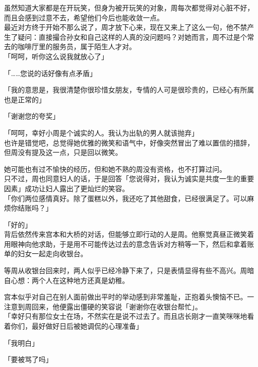 虽然知道大家都是在开玩笑，但身为被开玩笑的对象，周每次都觉得对心脏不好，而且会感到过意不去，希望他们今后也能收敛一点。\\

最近对方终于开始不那么说了，周才放下心来，现在又来上了这么一句，他不禁产生了疑问：直接撮合孙女和自己这样的人真的没问题吗？对她而言，周不过是个常去的咖啡厅里的服务员，属于陌生人才对。\\

「呵呵，听你这么说我就放心了」

「……您说的话好像有点矛盾」

「我的意思是，我很清楚你很珍惜女朋友，专情的人可是很珍贵的，已经心有所属也是正常的」

「谢谢您的夸奖」

「呵呵，幸好小周是个诚实的人。我认为出轨的男人就该抛弃」\\

也许是错觉吧，总觉得她优雅的微笑和语气中，好像突然冒出了难以置信的措辞，但周没有提及这一点，只是回以微笑。

她可能也有过不愉快的经历，但和她不熟的周没有资格，也不打算过问。\\

只不过，周也同意妇人的话，于是回答「您说得对，我认为诚实是共度一生的重要因素」成功让妇人露出了更灿烂的笑容。\\

「你们两位感情真好。除了蛋糕以外，我还吃了其他甜食，已经很满足了。可以麻烦你结账吗？」

「好的」\\

背后依然传来宫本和大桥的对话，但能够立即行动的人是周。他察觉真昼正微笑着用眼神向他求助，于是用不可能传达过去的意念告诉对方稍等一下，然后和拿着账单的妇女一起走向收银台。\\

\vspace{2\baselineskip}

等周从收银台回来时，两人似乎已经冷静下来了，只是表情显得有些不高兴。周暗自心想：两个人在这种地方还真是幼稚。

宫本似乎对自己在别人面前做出平时的举动感到非常羞耻，正抱着头懊恼不已。一注意到周回来，他便露出僵硬的笑容说「谢谢你在收银台帮忙」。\\

「幸好只有那位女士在场，不然实在是说不过去了。而且店长刚才一直笑咪咪地看着你们，最好做好日后被她调侃的心理准备」

「我明白」

「要被骂了吗」

